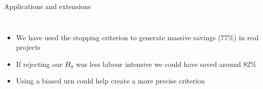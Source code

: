 \documentclass[9pt,aspectratio=169]{beamer}
\begin{document}
\begin{frame}{Applications and extensions}
\begin{columns}

\small

\begin{itemize}
	\item<1-> We have used the stopping criterion to generate massive savings (77\%) in real projects
	\item<2-> If rejecting our $H_0$ was less labour intensive we could have saved around 82\%
	\item<3-> Using a biased urn could help create a more precise criterion
\end{itemize}

\end{columns}

\end{frame}			

\end{document}
